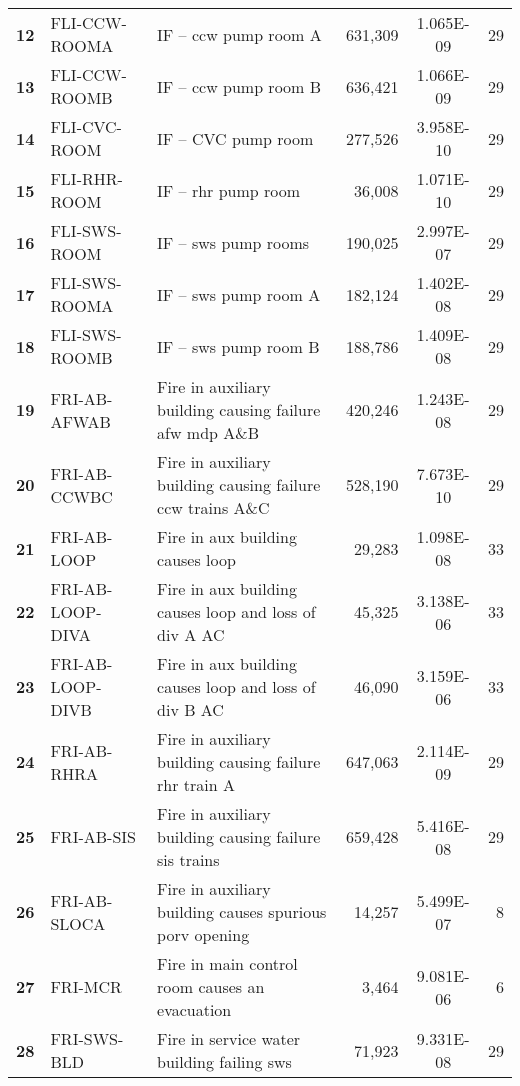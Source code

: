 \begin{longtable}{@{}lllrSr@{}}
\textbf{12} & FLI-CCW-ROOMA    & IF -- \acrshort{ccw} pump room A & 631,309   & 1.065E-09 & 29 \\
\textbf{13} & FLI-CCW-ROOMB    & IF -- \acrshort{ccw} pump room B & 636,421   & 1.066E-09 & 29 \\
\textbf{14} & FLI-CVC-ROOM     & IF -- CVC pump room & 277,526   & 3.958E-10 & 29 \\
\textbf{15} & FLI-RHR-ROOM     & IF -- \acrshort{rhr} pump room & 36,008    & 1.071E-10 & 29 \\
\textbf{16} & FLI-SWS-ROOM     & IF -- \acrshort{sws} pump rooms & 190,025   & 2.997E-07 & 29 \\
\textbf{17} & FLI-SWS-ROOMA    & IF -- \acrshort{sws} pump room A & 182,124   & 1.402E-08 & 29 \\
\textbf{18} & FLI-SWS-ROOMB    & IF -- \acrshort{sws} pump room B & 188,786   & 1.409E-08 & 29 \\
\textbf{19} & FRI-AB-AFWAB     & Fire in auxiliary building causing failure \acrshort{afw} \acrshort{mdp} A\&B & 420,246   & 1.243E-08 & 29 \\
\textbf{20} & FRI-AB-CCWBC     & Fire in auxiliary building causing failure \acrshort{ccw} trains A\&C & 528,190   & 7.673E-10 & 29 \\
\textbf{21} & FRI-AB-LOOP      & Fire in aux building causes \acrshort{loop} & 29,283    & 1.098E-08 & 33 \\
\textbf{22} & FRI-AB-LOOP-DIVA & Fire in aux building causes \acrshort{loop} and loss of div A AC & 45,325    & 3.138E-06 & 33 \\
\textbf{23} & FRI-AB-LOOP-DIVB & Fire in aux building causes \acrshort{loop} and loss of div B AC & 46,090    & 3.159E-06 & 33 \\
\textbf{24} & FRI-AB-RHRA      & Fire in auxiliary building causing failure \acrshort{rhr} train A & 647,063   & 2.114E-09 & 29 \\
\textbf{25} & FRI-AB-SIS       & Fire in auxiliary building causing failure \acrshort{sis} trains & 659,428   & 5.416E-08 & 29 \\
\textbf{26} & FRI-AB-SLOCA     & Fire in auxiliary building causes spurious \acrshort{porv} opening & 14,257    & 5.499E-07 & 8  \\
\textbf{27} & FRI-MCR          & Fire in main control room causes an evacuation & 3,464     & 9.081E-06 & 6  \\
\textbf{28} & FRI-SWS-BLD      & Fire in service water building failing \acrshort{sws} & 71,923    & 9.331E-08 & 29 \\

\end{longtable}
